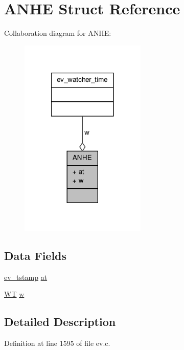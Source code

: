 \hypertarget{struct_a_n_h_e}{\section{\-A\-N\-H\-E \-Struct \-Reference}
\label{struct_a_n_h_e}
}


\-Collaboration diagram for \-A\-N\-H\-E\-:
\nopagebreak
\begin{figure}[H]
\begin{center}
\leavevmode
\includegraphics[width=170pt]{struct_a_n_h_e__coll__graph}
\end{center}
\end{figure}
\subsection*{\-Data \-Fields}
\begin{DoxyCompactItemize}
\item 
\hyperlink{ev_8h_add71e34ce2b04bbf7eb6f31a850814e8}{ev\-\_\-tstamp} \hyperlink{struct_a_n_h_e_a6160b512f37d4b32af5c7bad0c700b93}{at}
\item 
\hyperlink{ev_8c_a1634bbf7bbc46bf192d977104e39b6e1}{\-W\-T} \hyperlink{struct_a_n_h_e_af273b2db3bb121b1f6bd0ef8eff603e6}{w}
\end{DoxyCompactItemize}


\subsection{\-Detailed \-Description}


\-Definition at line 1595 of file ev.\-c.



